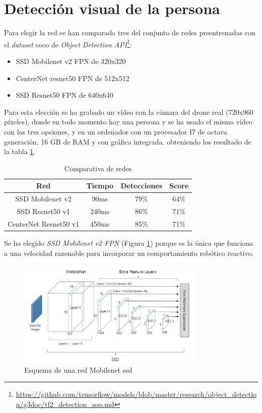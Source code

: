 \section{Detección visual de la persona}
Para elegir la red se han comparado tres del conjunto de redes preentrenadas con el \textit{dataset} \acrshort{coco} de \textit{Object Detection API}\footnote{\url{https://github.com/tensorflow/models/blob/master/research/object_detection/g3doc/tf2_detection_zoo.md}}:
\begin{itemize}
  \item SSD Mobilenet v2 FPN de 320x320
  \item CenterNet resnet50 FPN de 512x512
  \item SSD Resnet50 FPN de 640x640
\end{itemize}
Para esta elección se ha grabado un vídeo con la cámara del drone real (720x960 píxeles), donde en todo momento hay una persona y se ha usado el mismo vídeo con las tres opciones, y en un ordenador con un procesador I7 de octava generación, 16 GB de RAM y con gráfica integrada. obteniendo los resultado de la tabla \ref{tab:comparativa_redes}.
\begin{table}[H]
\centering
\begin{tabular}{|c|c|c|c|}
\hline
\textbf{Red}          & \textbf{Tiempo} & \textbf{Detecciones} & \textbf{Score} \\ \hline 
SSD Mobilenet v2      & 90ms            & 79\%        & 64\%           \\ \hline  
SSD Resnet50 v1       & 240ms           & 86\%        & 71\%           \\\hline  
CenterNet Resnet50 v1 & 450ms           & 85\%        & 71\%           \\ \hline 
\end{tabular}
\caption{Comparativa de redes}
\label{tab:comparativa_redes}
\end{table}
Se ha elegido \textit{SSD Mobilenet v2 FPN} (Figura \ref{fig:mobilenet}) porque es la única que funciona a una velocidad razonable para incorporar un comportamiento robótico reactivo.
\begin{figure}[H]
  \begin{center}
    \includegraphics[width=0.8\textwidth]{figures/real/mobilenet.png}
		\caption{Esquema de una red Mobilenet \acrshort{ssd}}
		\label{fig:mobilenet}
		\end{center}
\end{figure}
